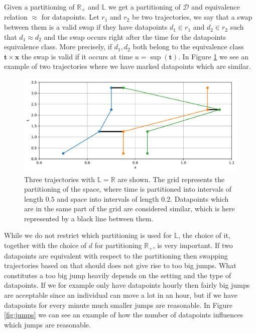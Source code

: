 \documentclass[12pt]{article}
\newcommand{\R}{\mathbb{R}}
\newcommand{\data}{d}
\newcommand{\swaptime}{u}
\newcommand{\locset}{\mathbb{L}}
\newcommand{\timeset}{\mathbb{R}_+}
\newcommand{\dataset}{\mathcal{D}}
\newcommand{\locint}{\mathbf{x}}
\newcommand{\timint}{\mathbf{t}}
\theoremstyle{definition}
\begin{document}
Given a partitioning of \(\timeset\) and \(\locset\) we get a
partitioning of \(\dataset\) and equivalence relation \(\approx\) for
datapoints. Let \(r_{1}\) and \(r_{2}\) be two trajectories, we say
that a swap between them is a valid swap if they have datapoints
\(\data_{1} \in r_{1}\) and \(\data_{2} \in r_{2}\) such that
\(\data_{1} \approx \data_{2}\) and the swap occurs right after the
time for the datapoints equivalence class. More precisely, if
\(\data_{1}, \data_{2}\) both belong to the equivalence class
\(\timint \times \locint\) the swap is valid if it occurs at time
\(\swaptime = \sup(\timint)\). In Figure \ref{fig:similar} we see an
example of two trajectories where we have marked datapoints which
are similar.

\begin{figure}
  \centering
  \includegraphics[width=12cm]{similar.pdf}
  \caption{Three trajectories with \(\locset = \R\) are shown. The
    grid represents the partitioning of the space, where time is
    partitioned into intervals of length \(0.5\) and space into
    intervals of length \(0.2\). Datapoints which are in the same
    part of the grid are considered similar, which is here represented
    by a black line between them.}
  \label{fig:similar}
\end{figure}

While we do not restrict which partitioning is used for \(\locset\),
the choice of it, together with the choice of \(d\) for partitioning
\(\timeset\), is very important. If two datapoints are equivalent with
respect to the partitioning then swapping trajectories based on that
should does not give rise to too big jumps. What constitutes a too big
jump heavily depends on the setting and the type of datapoints. If we
for example only have datapoints hourly then fairly big jumps are
acceptable since an individual can move a lot in an hour, but if we
have datapoints for every minute much smaller jumps are reasonable. In
Figure \ref{fig:jumps} we can see an example of how the number of
datapoints influences which jumps are reasonable.
\end{document}
